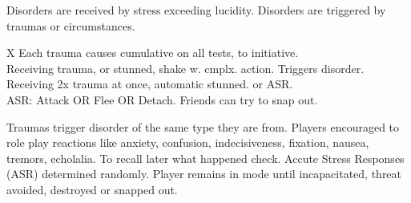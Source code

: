 \begin{itemize}
    \itembox Disorders are received by stress exceeding lucidity.
    \itembox Disorders are triggered by traumas or circumstances.
\end{itemize}

\bigskip

\begin{eptable}{ X }
   Each trauma causes cumulative  on all tests,  to initiative.\\
   Receiving trauma,  or stunned, shake w. cmplx. action. Triggers disorder.\\
   Receiving 2x trauma at once, automatic stunned.  or ASR.\\
   ASR: Attack OR Flee OR Detach. Friends can try  to snap out.\\
\end{eptable}

\begin{itemize}
    \itembox Traumas trigger disorder of the same type they are from.
    \itembox Players encouraged to role play reactions like anxiety, confusion, indecisiveness, fixation, nausea, tremors, echolalia.
    \itembox To recall later what happened  check.
    \itembox Accute Stress Responses (ASR) determined randomly. Player remains in mode until incapacitated, threat avoided, destroyed or snapped out.
\end{itemize}


\bigskip


